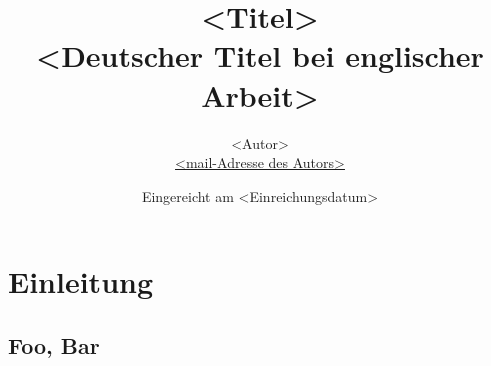 \documentclass[
        a4paper,     %
        titlepage,   %
        twoside,     %
        parskip      %
        ]{scrartcl} %
\title{<Titel>
\\ \bigskip 
\large{<Deutscher Titel bei englischer Arbeit> }}
\author{<Autor>\\{\small{\url{<mail-Adresse des Autors>}}}}
\date{Eingereicht am <Einreichungsdatum>}
\begin{document}
  \maketitle    %


  \cleardoublepage %



  \section{Einleitung}

    \cite{vossen94datenmodelle}

    \cite{ullman83principles}

    \subsection{Foo, Bar}

    \cite{agrawal94fast}

    \cite{bloom70space-time}



    \clearpage %
    
\end{document}
